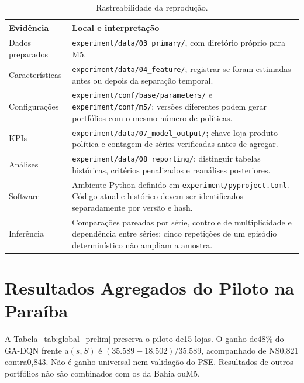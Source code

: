 \begin{table}[htbp]\centering\small
\caption{Rastreabilidade da reprodução.}\label{tab:validation_env}
\begin{tabular}{@{}p{3cm}p{11.4cm}@{}}\toprule
\textbf{Evidência} & \textbf{Local e interpretação}\\\midrule
Dados preparados & \nolinkurl{experiment/data/03_primary/}, com diretório próprio para M5.\\
Características & \nolinkurl{experiment/data/04_feature/}; registrar se foram estimadas antes ou depois da separação temporal.\\
Configurações & \nolinkurl{experiment/conf/base/parameters/} e \nolinkurl{experiment/conf/m5/}; versões diferentes podem gerar portfólios com o mesmo número de políticas.\\
KPIs & \nolinkurl{experiment/data/07_model_output/}; chave loja-produto-política e contagem de séries verificadas antes de agregar.\\
Análises & \nolinkurl{experiment/data/08_reporting/}; distinguir tabelas históricas, critérios penalizados e reanálises posteriores.\\
Software & Ambiente Python definido em \nolinkurl{experiment/pyproject.toml}. Código atual e histórico devem ser identificados separadamente por versão e hash.\\
Inferência & Comparações pareadas por série, controle de multiplicidade e dependência entre séries; cinco repetições de um episódio determinístico não ampliam a amostra.\\
\bottomrule\end{tabular}\end{table}

\section{Resultados Agregados do Piloto na Paraíba}
\label{app:fase1_resultados}
A Tabela~\ref{tab:global_prelim} preserva o piloto de15 lojas. O ganho de48\% do GA-DQN frente a$(s,S)$ é $(35.589-18.502)/35.589$, acompanhado de NS0,821 contra0,843. Não é ganho universal nem validação do PSE. Resultados de outros portfólios não são combinados com os da Bahia ouM5.

